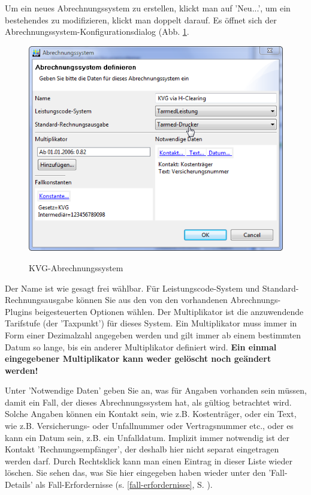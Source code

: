 \documentclass[a4paper]{scrartcl}
\begin{document}
Um ein neues Abrechnungssystem zu erstellen, klickt man auf 'Neu...', um ein bestehendes zu modifizieren, klickt man doppelt darauf. Es öffnet sich der Abrechnungssystem-Konfigurationsdialog (Abb. \ref{fig:abr2}.
\begin{figure}
  \includegraphics{abr2}\\
  \caption{KVG-Abrechnungssystem}\label{fig:abr2}
\end{figure}
Der Name ist wie gesagt frei wählbar. Für Leistungscode-System und Standard-Rechnungsausgabe können Sie aus den von den vorhandenen Abrechnungs-Plugins beigesteuerten Optionen wählen. Der Multiplikator ist die anzuwendende Tarifstufe (der 'Taxpunkt') für dieses System. Ein Multiplikator muss immer in Form einer Dezimalzahl angegeben werden und gilt immer ab einem bestimmten Datum so lange, bis ein anderer Multiplikator definiert wird. \textbf{Ein einmal eingegebener Multiplikator kann weder gelöscht noch geändert werden!}

Unter 'Notwendige Daten' geben Sie an, was für Angaben vorhanden sein müssen, damit ein Fall, der dieses Abrechnungssystem hat, als gültiog betrachtet wird. Solche Angaben können ein Kontakt sein, wie z.B. Kostenträger, oder ein Text, wie z.B. Versicherungs- oder Unfallnummer oder Vertragsnummer etc., oder es kann ein Datum sein, z.B. ein Unfalldatum.
Implizit immer notwendig ist der Kontakt 'Rechnungsempfänger', der deshalb hier nicht separat eingetragen werden darf.
Durch Rechtsklick kann man einen Eintrag in dieser Liste wieder löschen. Sie sehen das, was Sie hier eingegeben haben wieder unter den 'Fall-Details' als Fall-Erfordernisse (s. \ref{fall-erfordernisse}, S. \pageref{fall-erfordernisse}).
\end{document}
